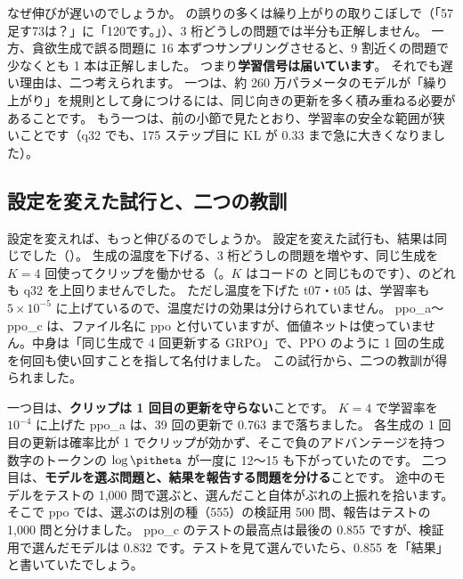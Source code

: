 なぜ伸びが遅いのでしょうか。
 の誤りの多くは繰り上がりの取りこぼしで（「57足す73は？」に「120です。」）、3 桁どうしの問題では半分も正解しません。
一方、貪欲生成で誤る問題に 16 本ずつサンプリングさせると、9 割近くの問題で少なくとも 1 本は正解しました。
つまり\textbf{学習信号は届いています}。
それでも遅い理由は、二つ考えられます。
一つは、約 260 万パラメータのモデルが「繰り上がり」を規則として身につけるには、同じ向きの更新を多く積み重ねる必要があることです。
もう一つは、前の小節で見たとおり、学習率の安全な範囲が狭いことです（q32 でも、175 ステップ目に KL が 0.33 まで急に大きくなりました）。

\subsection{設定を変えた試行と、二つの教訓}\label{sec:rl-exp-trials}

設定を変えれば、もっと伸びるのでしょうか。
設定を変えた試行も、結果は同じでした（）。
生成の温度を下げる、3 桁どうしの問題を増やす、同じ生成を $K=4$ 回使ってクリップを働かせる（。$K$ はコードの  と同じものです）、のどれも q32 を上回りませんでした。
ただし温度を下げた t07・t05 は、学習率も $5\times10^{-5}$ に上げているので、温度だけの効果は分けられていません。
ppo\_a〜ppo\_c は、ファイル名に ppo と付いていますが、価値ネットは使っていません。中身は「同じ生成で 4 回更新する GRPO」で、PPO のように 1 回の生成を何回も使い回すことを指して名付けました。
この試行から、二つの教訓が得られました。

一つ目は、\textbf{クリップは 1 回目の更新を守らない}ことです。
$K=4$ で学習率を $10^{-4}$ に上げた ppo\_a は、39 回の更新で 0.763 まで落ちました。
各生成の 1 回目の更新は確率比が 1 でクリップが効かず、そこで負のアドバンテージを持つ数字のトークンの $\log\pitheta$ が一度に 12〜15 も下がっていたのです。
二つ目は、\textbf{モデルを選ぶ問題と、結果を報告する問題を分ける}ことです。
途中のモデルをテストの 1,000 問で選ぶと、選んだこと自体がぶれの上振れを拾います。
そこで ppo では、選ぶのは別の種（555）の検証用 500 問、報告はテストの 1,000 問と分けました。
ppo\_c のテストの最高点は最後の 0.855 ですが、検証用で選んだモデルは 0.832 です。テストを見て選んでいたら、0.855 を「結果」と書いていたでしょう。

